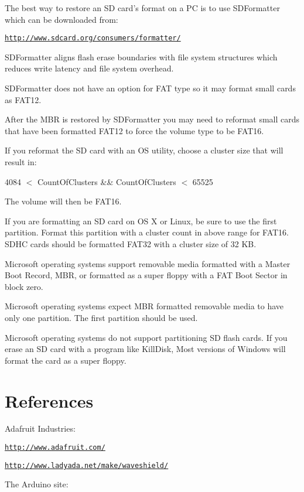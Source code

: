 The best way to restore an S\-D card's format on a P\-C is to use S\-D\-Formatter which can be downloaded from\-:

\href{http://www.sdcard.org/consumers/formatter/}{\tt http\-://www.\-sdcard.\-org/consumers/formatter/}

S\-D\-Formatter aligns flash erase boundaries with file system structures which reduces write latency and file system overhead.

S\-D\-Formatter does not have an option for F\-A\-T type so it may format small cards as F\-A\-T12.

After the M\-B\-R is restored by S\-D\-Formatter you may need to reformat small cards that have been formatted F\-A\-T12 to force the volume type to be F\-A\-T16.

If you reformat the S\-D card with an O\-S utility, choose a cluster size that will result in\-:

4084 $<$ Count\-Of\-Clusters \&\& Count\-Of\-Clusters $<$ 65525

The volume will then be F\-A\-T16.

If you are formatting an S\-D card on O\-S X or Linux, be sure to use the first partition. Format this partition with a cluster count in above range for F\-A\-T16. S\-D\-H\-C cards should be formatted F\-A\-T32 with a cluster size of 32 K\-B.

Microsoft operating systems support removable media formatted with a Master Boot Record, M\-B\-R, or formatted as a super floppy with a F\-A\-T Boot Sector in block zero.

Microsoft operating systems expect M\-B\-R formatted removable media to have only one partition. The first partition should be used.

Microsoft operating systems do not support partitioning S\-D flash cards. If you erase an S\-D card with a program like Kill\-Disk, Most versions of Windows will format the card as a super floppy.\hypertarget{index_References}{}\section{References}\label{index_References}
Adafruit Industries\-:

\href{http://www.adafruit.com/}{\tt http\-://www.\-adafruit.\-com/}

\href{http://www.ladyada.net/make/waveshield/}{\tt http\-://www.\-ladyada.\-net/make/waveshield/}

The Arduino site\-:

